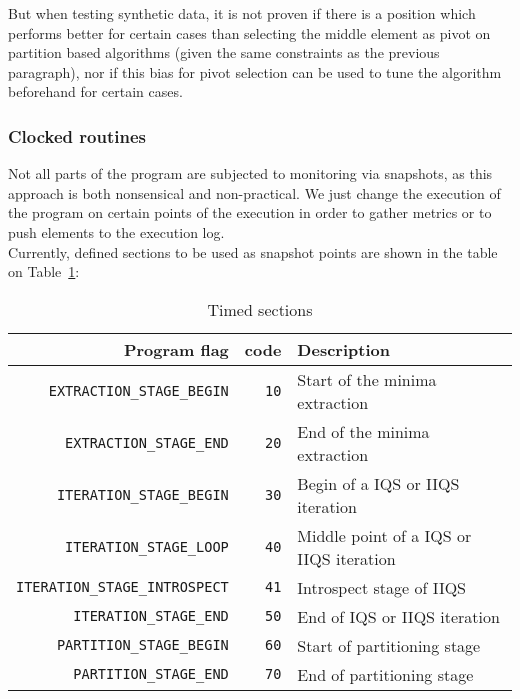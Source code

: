 But when testing synthetic data, it is not proven if there is a position which performs better for certain cases than selecting the middle element as pivot on partition based algorithms (given the same constraints as the previous paragraph), nor if this bias for pivot selection can be used to tune the algorithm beforehand for certain cases.\\

\subsubsection{Clocked routines}
Not all parts of the program are subjected to monitoring via snapshots, as this approach is both nonsensical and non-practical. We just change the execution of the program on certain points of the execution in order to gather metrics or to push elements to the execution log. \\

Currently, defined sections to be used as snapshot points are shown in the table on Table~\ref{TABLE:POINTS}:

\begin{table}[!ht]
    \centering
    \caption{Timed sections}
    \begin{tabularx}{\linewidth}{|r|r|X|}
        \hline
        Program flag & code & Description \\
        \hline
        \texttt{EXTRACTION\_STAGE\_BEGIN} & \texttt{10} & Start of the minima extraction\\
        \hline
        \texttt{EXTRACTION\_STAGE\_END} & \texttt{20} & End of the minima extraction \\
        \hline
        \texttt{ITERATION\_STAGE\_BEGIN} & \texttt{30} & Begin of a IQS or IIQS iteration \\
        \hline
        \texttt{ITERATION\_STAGE\_LOOP} & \texttt{40} & Middle point of a IQS or IIQS iteration \\
        \hline
        \texttt{ITERATION\_STAGE\_INTROSPECT} & \texttt{41} & Introspect stage of IIQS \\
        \hline
        \texttt{ITERATION\_STAGE\_END} & \texttt{50} & End of IQS or IIQS iteration \\
        \hline
        \texttt{PARTITION\_STAGE\_BEGIN} & \texttt{60} & Start of partitioning stage \\
        \hline
        \texttt{PARTITION\_STAGE\_END} & \texttt{70} & End of partitioning stage \\
        \hline
    \end{tabularx}
    \label{TABLE:POINTS}
\end{table}

\FloatBarrier
